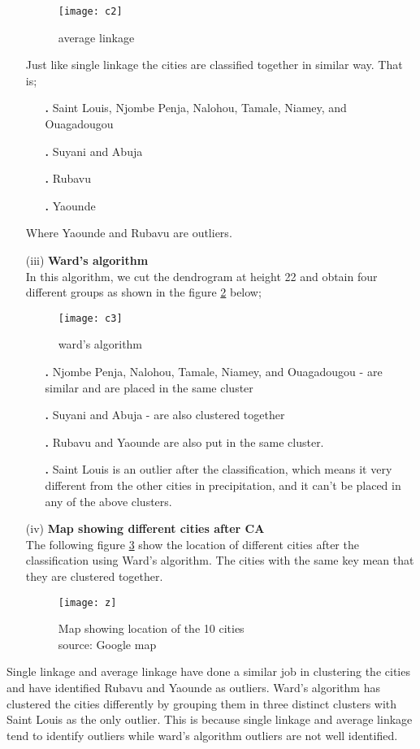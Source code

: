 \documentclass[12pt,a4paper]{article}
\begin{document}
\begin{enumerate}
\begin{figure}[H]
\texttt{[image: c2]}
\centering
\caption{average linkage}
\label{fig 2}
\end{figure}
Just like single linkage the cities are classified together in similar way.
That is;
\begin{enumerate}
\item[\textbf{.}]Saint Louis, Njombe Penja, Nalohou, Tamale, Niamey, and Ouagadougou
\item[\textbf{.}]Suyani and Abuja
\item[\textbf{.}]Rubavu 
\item[\textbf{.}] Yaounde
\end{enumerate}
Where Yaounde and Rubavu are outliers.
\item[(iii)]
\textbf{Ward’s algorithm}\\
In this algorithm, we cut the  dendrogram at height 22 and obtain four different groups as shown in the figure \ref{fig a} below;
\begin{figure}[H]
\texttt{[image: c3]}
\centering
\caption{ward's algorithm}
\label{fig a}
\end{figure} 
\begin{enumerate}
\item[\textbf{.}] Njombe Penja, Nalohou, Tamale, Niamey, and Ouagadougou - are similar and are placed in the same cluster
\item[\textbf{.}]Suyani and Abuja - are also clustered together
\item[\textbf{.}]Rubavu and Yaounde are also put in the same cluster. 
\item[\textbf{.}] Saint Louis is an outlier after the classification, which means it very different from the other cities in precipitation, and it can't be placed in any of the above clusters. 
\end{enumerate}
\item[(iv)]
\textbf{Map showing different cities after CA }\\
The following figure \ref{fig 13} show the location of different cities after the classification using Ward's algorithm. The cities with the same key mean that they are clustered together.
\begin{figure}[H]
\texttt{[image: z]}
\centering
\caption{Map showing location of the 10 cities\\source: Google map}
\label{fig 13}
\end{figure}
\end{enumerate}
Single linkage and average linkage have done a similar job in clustering the cities and have identified Rubavu and Yaounde as outliers. Ward's algorithm has clustered the cities differently by grouping them in three distinct clusters with Saint Louis as the only outlier.
This is because single linkage and average linkage tend to identify outliers while ward's algorithm outliers are not well identified.
\end{document}
